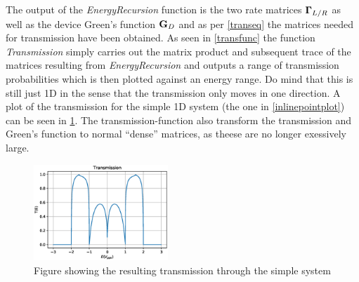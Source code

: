 \vspace{-.5\baselineskip}
\vspace{\baselineskip}
The output of the \textit{EnergyRecursion} function is the two rate matrices \(\vb{\Gamma}_{L/R}\) as well as the device Green's function \(\vb{G}_D\) and as per \cref{transeq} the matrices needed for transmission have been obtained. As seen in \cref{transfunc} the function \textit{Transmission} simply carries out the matrix product and subsequent trace of the matrices resulting from \textit{EnergyRecursion} and outputs a range of transmission probabilities which is then plotted against an energy range. Do mind that this is still just 1D in the sense that the transmission only moves in one direction. A plot of the transmission for the simple 1D system (the one in \cref{inlinepointplot}) can be seen in \cref{Transsimple}.
\vspace{-.5\baselineskip}
\vspace{\baselineskip}
The transmission-function also transform the transmission and Green's function to normal ``dense'' matrices, as theese are no longer exessively large.
\begin{figure}[ht]
	\includegraphics[width=0.45\textwidth]{Figures/BetaTE.eps}
	\caption{Figure showing the resulting transmission through the simple system}\label{Transsimple}
\end{figure}
